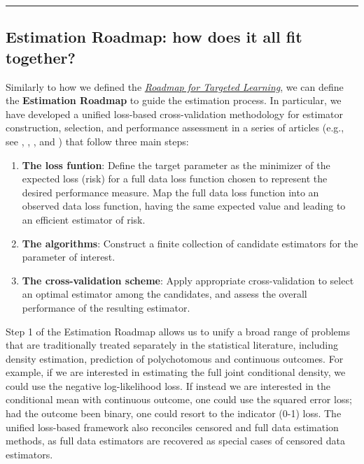 \documentclass[12pt, krantz2,]{krantz}
\theoremstyle{definition}
\theoremstyle{definition}
\theoremstyle{definition}
\newcommand{\1}{\mathbbm{1}}
\begin{document}
\begin{center}\rule{0.5\linewidth}{0.5pt}\end{center}

\hypertarget{estimation-roadmap-how-does-it-all-fit-together}{%
\subsection{Estimation Roadmap: how does it all fit together?}\label{estimation-roadmap-how-does-it-all-fit-together}}

Similarly to how we defined the \protect\hyperlink{roadmap}{\emph{Roadmap for Targeted Learning}}, we
can define the \textbf{Estimation Roadmap} to guide the estimation process. In
particular, we have developed a unified loss-based cross-validation methodology
for estimator construction, selection, and performance assessment in a series of
articles (e.g., see \citet{vdl2004asymptotic}, \citet{dudoit2005asymptotics},
\citet{vaart2006oracle}, and \citet{vdl2007super}) that follow three main steps:

\begin{enumerate}
\def\labelenumi{\arabic{enumi}.}
\item
  \textbf{The loss funtion}:
  Define the target parameter as the minimizer of the expected loss (risk) for a
  full data loss function chosen to represent the desired performance measure.
  Map the full data loss function into an observed data loss function, having the
  same expected value and leading to an efficient estimator of risk.
\item
  \textbf{The algorithms}:
  Construct a finite collection of candidate estimators for the parameter of
  interest.
\item
  \textbf{The cross-validation scheme}:
  Apply appropriate cross-validation to select an optimal estimator among the
  candidates, and assess the overall performance of the resulting estimator.
\end{enumerate}

Step 1 of the Estimation Roadmap allows us to unify a broad range of problems
that are traditionally treated separately in the statistical literature,
including density estimation, prediction of polychotomous and continuous
outcomes. For example, if we are interested in estimating the full joint
conditional density, we could use the negative log-likelihood loss. If instead
we are interested in the conditional mean with continuous outcome, one could use
the squared error loss; had the outcome been binary, one could resort to the
indicator (0-1) loss. The unified loss-based framework also reconciles censored
and full data estimation methods, as full data estimators are recovered as
special cases of censored data estimators.
\end{document}
